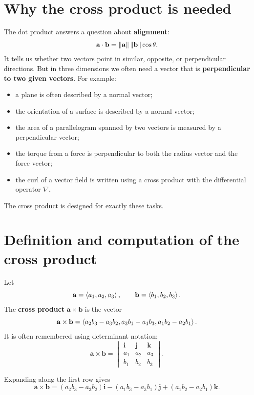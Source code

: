 \section{Why the cross product is needed}

The dot product answers a question about \textbf{alignment}:
\[
\mathbf a\cdot\mathbf b=\left\lVert \mathbf a\right\rVert\left\lVert \mathbf b\right\rVert\cos\theta.
\]
It tells us whether two vectors point in similar, opposite, or perpendicular directions. But in three dimensions we often need a vector that is \textbf{perpendicular to two given vectors}. For example:
\begin{itemize}
\item a plane is often described by a normal vector;
\item the orientation of a surface is described by a normal vector;
\item the area of a parallelogram spanned by two vectors is measured by a perpendicular vector;
\item the torque from a force is perpendicular to both the radius vector and the force vector;
\item the curl of a vector field is written using a cross product with the differential operator $\nabla$.
\end{itemize}

The cross product is designed for exactly these tasks.

\section{Definition and computation of the cross product}

\begin{definitionbox}[title={Cross product in $\R^3$}]
Let
\[
\mathbf a=\left\langle a_1,a_2,a_3\right\rangle,\qquad
\mathbf b=\left\langle b_1,b_2,b_3\right\rangle.
\]
The \textbf{cross product} $\mathbf a\times\mathbf b$ is the vector
\[
\mathbf a\times \mathbf b
=
\left\langle 
 a_2b_3-a_3b_2,
 a_3b_1-a_1b_3,
 a_1b_2-a_2b_1
\right\rangle.
\]
It is often remembered using determinant notation:
\[
\mathbf a\times\mathbf b
=
\begin{vmatrix}
\mathbf i & \mathbf j & \mathbf k\\
a_1 & a_2 & a_3\\
b_1 & b_2 & b_3
\end{vmatrix}.
\]
\end{definitionbox}

Expanding along the first row gives
\[
\mathbf a\times \mathbf b
=(a_2b_3-a_3b_2)\mathbf i
-(a_1b_3-a_3b_1)\mathbf j
+(a_1b_2-a_2b_1)\mathbf k.
\]


